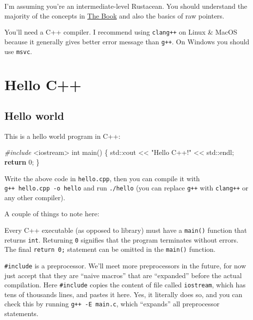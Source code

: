 \documentclass[
]{book}
\newenvironment{Shaded}{\begin{snugshade}}{\end{snugshade}}
\newcommand{\BuiltInTok}[1]{#1}
\newcommand{\ControlFlowTok}[1]{\textcolor[rgb]{0.13,0.29,0.53}{\textbf{#1}}}
\newcommand{\DataTypeTok}[1]{\textcolor[rgb]{0.13,0.29,0.53}{#1}}
\newcommand{\DecValTok}[1]{\textcolor[rgb]{0.00,0.00,0.81}{#1}}
\newcommand{\ImportTok}[1]{#1}
\newcommand{\NormalTok}[1]{#1}
\newcommand{\PreprocessorTok}[1]{\textcolor[rgb]{0.56,0.35,0.01}{\textit{#1}}}
\newcommand{\StringTok}[1]{\textcolor[rgb]{0.31,0.60,0.02}{#1}}
\begin{document}
I'm assuming you're an intermediate-level Rustacean. You should understand the majority of the concepts in \href{https://doc.rust-lang.org/book/}{The Book} and also the basics of raw pointers.

You'll need a C++ compiler. I recommend using \texttt{clang++} on Linux \& MacOS because it generally gives better error message than \texttt{g++}. On Windows you should use \texttt{msvc}.

\hypertarget{hello-c}{%
\chapter{Hello C++}\label{hello-c}}

\hypertarget{hello-world}{%
\section{Hello world}\label{hello-world}}

This is a hello world program in C++:

\begin{Shaded}
\begin{Highlighting}[]
\PreprocessorTok{\#include }\ImportTok{\textless{}iostream\textgreater{}}
\DataTypeTok{int}\NormalTok{ main()}
\NormalTok{\{}
    \BuiltInTok{std::}\NormalTok{cout \textless{}\textless{} }\StringTok{"Hello C++!"}\NormalTok{ \textless{}\textless{} }\BuiltInTok{std::}\NormalTok{endl;}
    \ControlFlowTok{return} \DecValTok{0}\NormalTok{;}
\NormalTok{\}}
\end{Highlighting}
\end{Shaded}

Write the above code in \texttt{hello.cpp}, then you can compile it with \texttt{g++\ hello.cpp\ -o\ hello} and run \texttt{./hello} (you can replace \texttt{g++} with \texttt{clang++} or any other compiler).

A couple of things to note here:

Every C++ executable (as opposed to library) must have a \texttt{main()} function that returns \texttt{int}. Returning \texttt{0} signifies that the program terminates without errors. The final \texttt{return\ 0;} statement can be omitted in the \texttt{main()} function.

\texttt{\#include} is a preprocessor. We'll meet more preprocessors in the future, for now just accept that they are ``naive macros'' that are ``expanded'' before the actual compilation.
Here \texttt{\#include} copies the content of file called \texttt{iostream}, which has tens of thousands lines, and pastes it here. Yes, it literally does so, and you can check this by running \texttt{g++\ -E\ main.c}, which ``expands'' all preprocessor statements.
\end{document}
